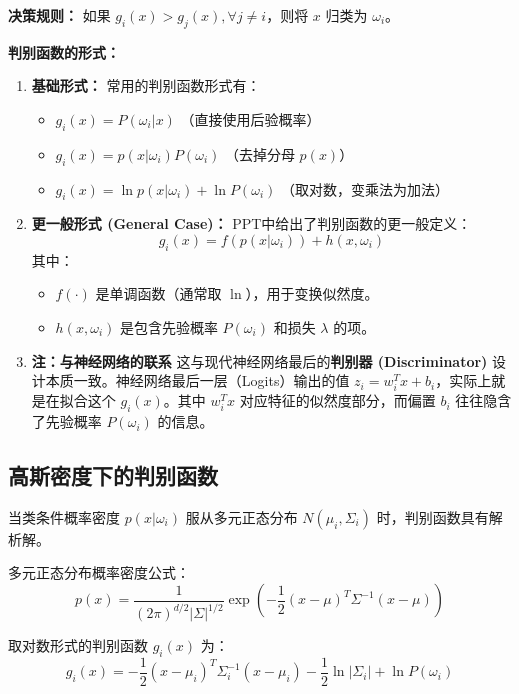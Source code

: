 \documentclass[a4paper, 11pt]{ctexart}
\begin{document}
\textbf{决策规则：}
如果 $g_i(x) > g_j(x), \forall j \neq i$，则将 $x$ 归类为 $\omega_i$。

\textbf{判别函数的形式：}
\begin{enumerate}
    \item \textbf{基础形式：}
    常用的判别函数形式有：
    \begin{itemize}
        \item $g_i(x) = P(\omega_i|x)$ （直接使用后验概率）
        \item $g_i(x) = p(x|\omega_i)P(\omega_i)$ （去掉分母 $p(x)$）
        \item $g_i(x) = \ln p(x|\omega_i) + \ln P(\omega_i)$ （取对数，变乘法为加法）
    \end{itemize}

    \item \textbf{更一般形式 (General Case)：}
    PPT中给出了判别函数的更一般定义：
    \begin{equation}
        g_i(x) = f(p(x|\omega_i)) + h(x, \omega_i)
    \end{equation}
    其中：
    \begin{itemize}
        \item $f(\cdot)$ 是单调函数（通常取 $\ln$），用于变换似然度。
        \item $h(x, \omega_i)$ 是包含先验概率 $P(\omega_i)$ 和损失 $\lambda$ 的项。
    \end{itemize}

    \item \textbf{注：与神经网络的联系}
    这与现代神经网络最后的\textbf{判别器 (Discriminator)} 设计本质一致。神经网络最后一层（Logits）输出的值 $z_i = w_i^T x + b_i$，实际上就是在拟合这个 $g_i(x)$。其中 $w_i^T x$ 对应特征的似然度部分，而偏置 $b_i$ 往往隐含了先验概率 $P(\omega_i)$ 的信息。
\end{enumerate}

\subsection{高斯密度下的判别函数}
当类条件概率密度 $p(x|\omega_i)$ 服从多元正态分布 $N(\mu_i, \Sigma_i)$ 时，判别函数具有解析解。

多元正态分布概率密度公式：
\begin{equation}
    p(x) = \frac{1}{(2\pi)^{d/2}|\Sigma|^{1/2}} \exp \left( -\frac{1}{2}(x-\mu)^T \Sigma^{-1} (x-\mu) \right)
\end{equation}

取对数形式的判别函数 $g_i(x)$ 为：
\begin{equation}
    g_i(x) = -\frac{1}{2}(x-\mu_i)^T \Sigma_i^{-1} (x-\mu_i) - \frac{1}{2}\ln|\Sigma_i| + \ln P(\omega_i)
\end{equation}
\end{document}
